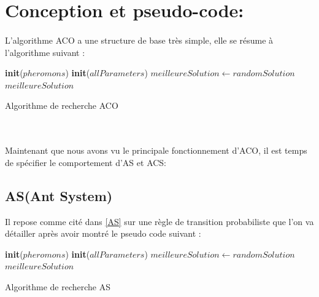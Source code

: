 	\section{Conception et pseudo-code:}
	\paragraph{}
	L'algorithme ACO a une structure de base très simple, elle se résume à l'algorithme suivant : 
	\begin{algorithm}
		\SetAlgoLined
		\textbf{init}($pheromons$)\;
		\textbf{init}($allParameters$)\;
		$meilleureSolution \gets randomSolution$\;
		\Return $meilleureSolution$\;
		\caption{Algorithme de recherche ACO}
	\end{algorithm}\\
	\newpage
	\paragraph{}
	Maintenant que nous avons vu le principale fonctionnement d'ACO, il est temps de spécifier le comportement d'AS et ACS:
	\subsection{AS(Ant System)}
	Il repose comme cité dans \ref{AS} sur une règle de transition probabiliste que l'on va détailler après avoir montré le pseudo code suivant : 
	
	\begin{algorithm}[H]
		\SetAlgoLined
		\textbf{init}($pheromons$)\;
		\textbf{init}($allParameters$)
		$meilleureSolution \gets randomSolution$\;
		\Return $meilleureSolution$\;
		\caption{Algorithme de recherche AS}
	\end{algorithm}
	
